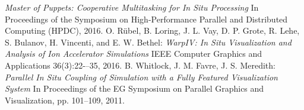 \begin{thebibliography}{0}
    \textsl{Master of Puppets: Cooperative Multitasking for In Situ Processing} In Proceedings of the Symposium on High-Performance Parallel and Distributed Computing (HPDC), 2016.
    O. Rübel, B. Loring, J. L. Vay, D. P. Grote, R. Lehe, S. Bulanov, H. Vincenti, and E. W. Bethel:
    \textsl{WarpIV: In Situ Visualization and Analysis of Ion Accelerator Simulations}
    IEEE Computer Graphics and Applications 36(3):22-–35, 2016.
    B. Whitlock, J. M. Favre, J. S. Meredith:
    \textsl{Parallel In Situ Coupling of Simulation with a Fully Featured Visualization System}
    In Proceedings of the EG Symposium on Parallel Graphics and Visualization, pp. 101–109, 2011.
\end{thebibliography}


